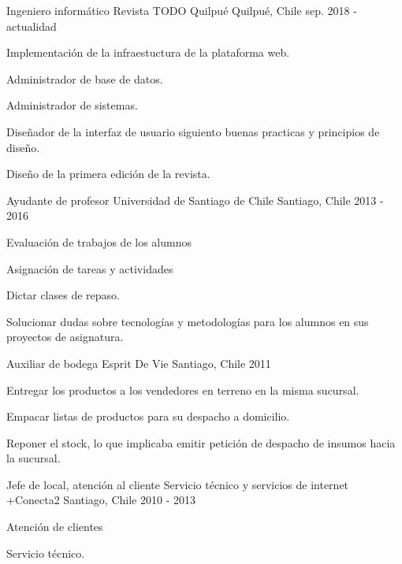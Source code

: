 
\begin{cventries}

  \cventry
    {Ingeniero informático} %
    {Revista TODO Quilpué} %
    {Quilpué, Chile} %
    {sep. 2018 - actualidad} %
    {
      \begin{cvitems}
      \item {Implementación de la infraestuctura de la plataforma web.}
      \item {Administrador de base de datos.}
      \item {Administrador de sistemas.}
      \item {Diseñador de la interfaz de usuario siguiento buenas practicas y 
        principios de diseño.}
      \item {Diseño de la primera edición de la revista.}
      \end{cvitems}
    } %

  \cventry
    {Ayudante de profesor}
    {Universidad de Santiago de Chile}
    {Santiago, Chile}
    {2013 - 2016}
    {
      \begin{cvitems}
      \item {Evaluación de trabajos de los alumnos}
      \item {Asignación de tareas y actividades}
      \item {Dictar clases de repaso.}
      \item {Solucionar dudas sobre tecnologías y metodologías para los 
        alumnos en sus proyectos de asignatura.}
      \end{cvitems}
    }

  \cventry
    {Auxiliar de bodega}
    {Esprit De Vie}
    {Santiago, Chile}
    {2011}
    {
      \begin{cvitems}
      \item {Entregar los productos a los vendedores en terreno en la misma 
        sucursal.}
      \item {Empacar listas de productos para su despacho a domicilio.}
      \item {Reponer el stock, lo que implicaba emitir petición de despacho 
        de insumos hacia la sucursal.}
      \end{cvitems}
    }

  \cventry
    {Jefe de local, atención al cliente}
    {Servicio técnico y servicios de internet +Conecta2}
    {Santiago, Chile}
    {2010 - 2013}
    {
      \begin{cvitems}
      \item Atención de clientes
      \item Servicio técnico.
      \end{cvitems}
    }
\end{cventries}
